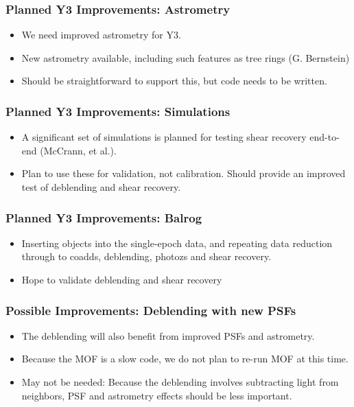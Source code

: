 \documentclass{beamer}
\begin{document}
\frame
{
    \frametitle{Planned Y3 Improvements: Astrometry}

    \begin{itemize}

        \item We need improved astrometry for Y3.
        \item New astrometry available, including such
            features as tree rings (G. Bernstein)
        \item Should be straightforward to support this,
            but code needs to be written.


    \end{itemize}

}

\frame
{
    \frametitle{Planned Y3 Improvements: Simulations}

    \begin{itemize}

        \item A significant set of simulations is planned
            for testing shear recovery end-to-end (McCrann, et al.).

        \item Plan to use these for validation, not calibration.  
            Should provide an improved test of deblending and
            shear recovery.

    \end{itemize}

}

\frame
{
    \frametitle{Planned Y3 Improvements: Balrog}

    \begin{itemize}

        \item Inserting objects into the single-epoch data, and
            repeating data reduction through to coadds, 
            deblending, photozs and shear recovery.

        \item Hope to validate deblending and shear recovery

    \end{itemize}

}


\frame
{
    \frametitle{Possible Improvements: Deblending with new PSFs}

    \begin{itemize}

        \item The deblending will also benefit from improved
            PSFs and astrometry.

        \item Because the MOF is a slow code, we do not plan
            to re-run MOF at this time.

        \item May not be needed: Because the deblending involves
            subtracting light from neighbors, PSF and astrometry
            effects should be less important.


    \end{itemize}

}
\end{document}
